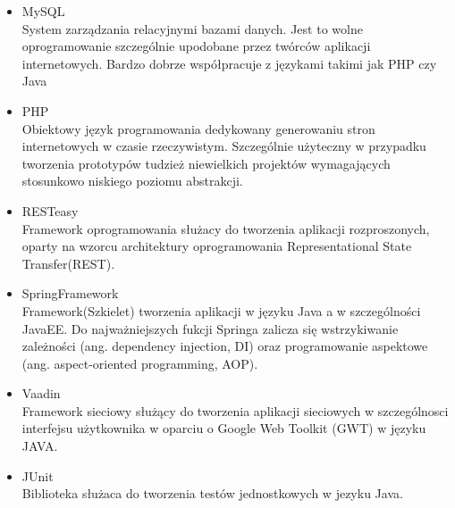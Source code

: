 \documentclass[11pt,a4paper,polish,thesis]{dcsbook}
\begin{document}
\begin{itemize}
\item{MySQL} \\
System zarządzania relacyjnymi bazami danych. Jest to wolne oprogramowanie szczególnie upodobane przez twórców aplikacji internetowych. Bardzo dobrze współpracuje z językami takimi jak PHP czy Java
\item{PHP} \\
Obiektowy język programowania dedykowany generowaniu stron internetowych w czasie rzeczywistym. Szczególnie użyteczny w przypadku tworzenia prototypów tudzież niewielkich projektów wymagających stosunkowo niskiego poziomu abstrakcji.
\item{RESTeasy} \\
Framework oprogramowania służacy do tworzenia aplikacji rozproszonych, oparty na wzorcu architektury oprogramowania Representational State Transfer(REST).
\item{SpringFramework} \\
Framework(Szkielet) tworzenia aplikacji w języku Java a w szczególności JavaEE. Do najważniejszych fukcji Springa zalicza się wstrzykiwanie zależności (ang. dependency injection, DI) oraz programowanie aspektowe (ang. aspect-oriented programming, AOP).  
\item{Vaadin} \\
Framework sieciowy służący do tworzenia aplikacji sieciowych w szczególnosci interfejsu użytkownika w oparciu o Google Web Toolkit (GWT) w języku JAVA.
\item{JUnit} \\
Biblioteka służaca do tworzenia testów jednostkowych w jezyku Java.
\end{itemize}
\end{document}
